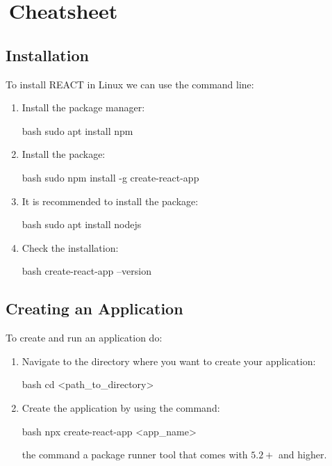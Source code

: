 \section{\,Cheatsheet}

\subsection{Installation}

To install REACT in Linux we can use the command line:
\begin{enumerate}
    \item Install the  package manager:
    \begin{mintedbox}{bash}
sudo apt install npm
    \end{mintedbox}
    \item Install the  package:
    \begin{mintedbox}{bash}
sudo npm install -g create-react-app
    \end{mintedbox}
    \item It is recommended to install the  package:
    \begin{mintedbox}{bash}
sudo apt install nodejs
    \end{mintedbox}
    \item Check the installation:
    \begin{mintedbox}{bash}
create-react-app --version
    \end{mintedbox}
\end{enumerate}

\subsection{Creating an Application}

To create and run an application do:
\begin{enumerate}
    \item Navigate to the directory where you want to create your application:
    \begin{mintedbox}{bash}
cd <path_to_directory>
    \end{mintedbox}
    \item Create the application by using the
     command:
    \begin{mintedbox}{bash}
npx create-react-app <app_name>
    \end{mintedbox}
    the  command a package runner tool that comes with  $5.2+$
    and higher.
\end{enumerate}

